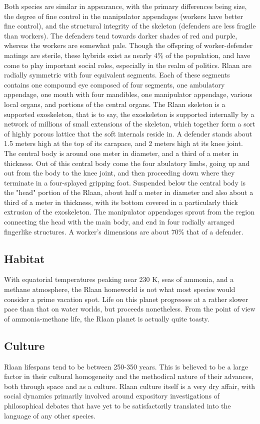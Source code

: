 Both species are similar in appearance, with the primary differences
being size, the degree of fine control in the manipulator appendages
(workers have better fine control), and the structural integrity of
the skeleton (defenders are less fragile than workers).  The defenders
tend towards darker shades of red and purple, whereas the workers are
somewhat pale. Though the offspring of worker-defender matings are
sterile, these hybrids exist as nearly 4\% of the population, and have
come to play important social roles, especially in the realm of
politics.  Rlaan are radially symmetric with four equivalent
segments. Each of these segments contains one compound eye composed of
four segments, one ambulatory appendage, one mouth with four
mandibles, one manipulator appendage, various local organs, and
portions of the central organs. The Rlaan skeleton is a supported
exoskeleton, that is to say, the exoskeleton is supported internally
by a network of millions of small extensions of the skeleton, which
together form a sort of highly porous lattice that the soft internals
reside in. A defender stands about 1.5 meters high at the top of its
carapace, and 2 meters high at its knee joint. The central body is
around one meter in diameter, and a third of a meter in thickness. Out
of this central body come the four abulatory limbs, going up and out
from the body to the knee joint, and then proceeding down where they
terminate in a four-splayed gripping foot. Suspended below the central
body is the "head" portion of the Rlaan, about half a meter in
diameter and also about a third of a meter in thickness, with its
bottom covered in a particularly thick extrusion of the
exoskeleton. The manipulator appendages sprout from the region
connecting the head with the main body, and end in four radially
arranged fingerlike structures. A worker's dimensions are about 70\%
that of a defender.

\subsection{Habitat}
With equatorial temperatures peaking near 230 K, seas of ammonia, and
a methane atmosphere, the Rlaan homeworld is not what most species
would consider a prime vacation spot. Life on this planet progresses
at a rather slower pace than that on water worlds, but proceeds
nonetheless. From the point of view of ammonia-methane life, the Rlaan
planet is actually quite toasty.

\subsection{Culture}
Rlaan lifespans tend to be between 250-350 years. This is believed to
be a large factor in their cultural homogeneity and the methodical
nature of their advances, both through space and as a culture. Rlaan
culture itself is a very dry affair, with social dynamics primarily
involved around expository investigations of philosophical debates
that have yet to be satisfactorily translated into the language of any
other species.

